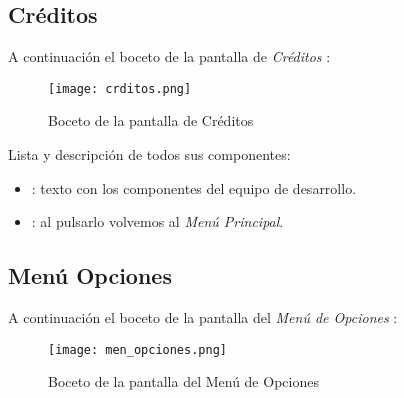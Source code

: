             \newpage
            \subsection{Créditos}
            A continuación el boceto de la pantalla de \emph{Créditos} :
            
            \begin{figure}[H] 
                \begin{center}
                    \texttt{[image: crditos.png]}
                \end{center}
                \caption{Boceto de la pantalla de Créditos}
                \label{fig:creditos}
            \end{figure}
            
            Lista y descripción de todos sus componentes:
            \begin{itemize}
            \item {}: texto con los componentes del equipo de desarrollo.
            \item {}: al pulsarlo volvemos al \emph{Menú Principal}.
            \end{itemize}
            
            \newpage
            \subsection{Menú Opciones}
        	A continuación el boceto de la pantalla del \emph{Menú de Opciones} :
	         
	         \begin{figure}[H] 
	             \begin{center}
	                 \texttt{[image: men\_opciones.png]}
	             \end{center}
	             \caption{Boceto de la pantalla del Menú de Opciones}
	             \label{fig:menu-opciones}
	         \end{figure}
	         

